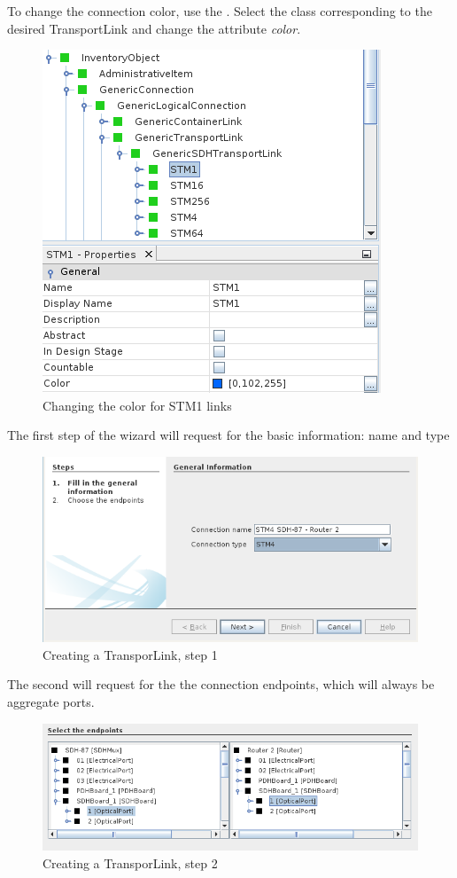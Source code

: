 \documentclass[a4paper]{article}
\begin{document}
		To change the connection color, use the . Select the class corresponding to the desired TransportLink and change the attribute \textit{color}.
		\begin{figure}[h!]
			\centering
			\includegraphics[width=0.6\linewidth]{img/sdh_module_transport_link_color.png}
			\caption{Changing the color for STM1 links}
			\label{fig:sdh_module_transport_link_color}
		\end{figure}
		
		The first step of the wizard will request for the basic information: name and type
		\begin{figure}[h!]
			\centering
			\includegraphics[width=\linewidth]{img/sdh_module_transport_link_step_1.png}
			\caption{Creating a TransporLink, step 1}
			\label{fig:sdh_module_transport_link_step_1}
		\end{figure}
		\newpage
		The second will request for the the connection endpoints, which will always be aggregate ports.
		\begin{figure}[h!]
			\centering
			\includegraphics[width=\linewidth]{img/sdh_module_transport_link_step_2.png}
			\caption{Creating a TransporLink, step 2}
			\label{fig:sdh_module_transport_link_step_2}
		\end{figure}
		
\end{document}
